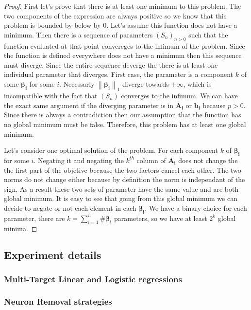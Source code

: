 \documentclass{article}
\newcommand{\norm}[1]{\left\lVert#1\right\rVert}
\begin{document}
\begin{proof}
First let's prove that there is at least one minimum to this problem. The two components of the expression are always positive so we know that this problem is bounded by below by $0$. Let's assume this function does not have a minimum. Then there is a sequence of parameters $(S_n)_{n>0}$ such that the function evaluated at that point convereges to the infimum of the problem. Since the function is defined everywhere does not have a minimum then this sequence must diverge. Since the entire sequence deverge the there is at least one individual parameter that diverges. First case, the parameter is a component $k$ of some $\bm{\beta_i}$ for some $i$. Necessarly $\norm{\bm{\beta_i}}_1$ diverge towards $+ \infty$, which is incompatible with the fact that $(S_n)$ converges to the infimum. We can have the exact same argument if the diverging parameter is in $\bm{A_i}$ or $\bm{b_i}$ because $p > 0$. Since there is always a contradiction then our assumption that the function has no global minimum must be false. Therefore, this problem has at least one global minimum.

\par Let's consider one optimal solution of the problem. For each component $k$ of $\bm{\beta_i}$ for some $i$. Negating it and negating the $k^{th}$ column of $\bm{A_i}$ does not change the the first part of the objetive because the two factors cancel each other. The two norms do not change either because by definition the norm is independant of the sign. As a result these two sets of parameter have the same value and are both global minimum. It is easy to see that going from this global minimum we can decide to negate or not each element in each $\bm{\beta_i}$. We have a binary choice for each parameter, there are $k = \sum_{i=1}^n \#\bm{\beta_i}$ parameters, so we have at least $2^k$ global minima.

\end{proof}
\subsection{Experiment details}
\subsubsection{Multi-Target Linear and Logistic regressions}
\label{linear_datasets}
\subsubsection{Neuron Removal strategies}
\end{document}

